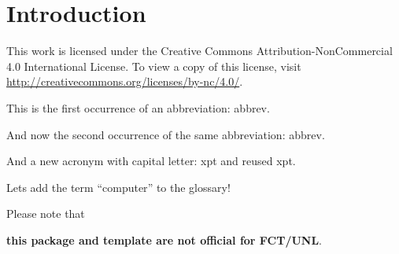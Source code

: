 \chapter{Introduction}
\label{cha:introduction}

This work is licensed under the Creative Commons Attribution-NonCommercial 4.0 International License.
To view a copy of this license, visit \url{http://creativecommons.org/licenses/by-nc/4.0/}.



This is the first occurrence of an abbreviation: \gls{abbrev}.

And now the second occurrence of the same abbreviation: \gls{abbrev}.

And a new acronym with capital letter: \Gls{xpt} and reused \gls{xpt}.

Lets add the term ``\gls{computer}'' to the glossary!

Please note that 
\begin{center}
	\textbf{\large this package and template are not official for FCT/UNL}.
\end{center}
